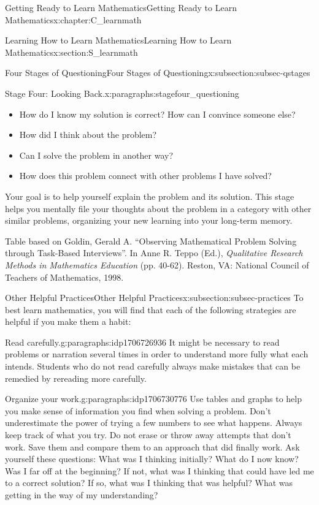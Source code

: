 \documentclass[oneside,10pt,]{book}
\newcommand{\pubtitle}[1]{\textsl{#1}}
\numberwithin{equation}{chapter}
\begin{document}
\begin{chapterptx}{Getting Ready to Learn Mathematics}{}{Getting Ready to Learn Mathematics}{}{}{x:chapter:C_learnmath}
\begin{sectionptx}{Learning How to Learn Mathematics}{}{Learning How to Learn Mathematics}{}{}{x:section:S_learnmath}
\begin{subsectionptx}{Four Stages of Questioning}{}{Four Stages of Questioning}{}{}{x:subsection:subsec-qstages}
\begin{paragraphs}{Stage Four: Looking Back.}{x:paragraphs:stagefour_questioning}
\par
%
\begin{itemize}[label=\textbullet]
\item{}How do I know my solution is correct? How can I convince someone else?%
\item{}How did I think about the problem?%
\item{}Can I solve the problem in another way?%
\item{}How does this problem connect with other problems I have solved?%
\end{itemize}
%
\par
Your goal is to help yourself explain the problem and its solution. This stage helps you mentally file your thoughts about the problem in a category with other similar problems, organizing your new learning into your long-term memory.%
\par
Table based on Goldin, Gerald A. ``Observing Mathematical Problem Solving through Task-Based Interviews''. In Anne R. Teppo (Ed.), \pubtitle{Qualitative Research Methods in Mathematics Education} (pp. 40-62). Reston, VA: National Council of Teachers of Mathematics, 1998.%
\end{paragraphs}%
\end{subsectionptx}
%
%
\typeout{************************************************}
\typeout{************************************************}
%
\begin{subsectionptx}{Other Helpful Practices}{}{Other Helpful Practices}{}{}{x:subsection:subsec-practices}
To best learn mathematics, you will find that each of the following strategies are helpful if you make them a habit:%
\begin{paragraphs}{Read carefully.}{g:paragraphs:idp1706726936}%
It might be necessary to read problems or narration several times in order to understand more fully what each intends. Students who do not read carefully always make mistakes that can be remedied by rereading more carefully.%
\end{paragraphs}%
\begin{paragraphs}{Organize your work.}{g:paragraphs:idp1706730776}%
Use tables and graphs to help you make sense of information you find when solving a problem. Don't underestimate the power of trying a few numbers to see what happens. Always keep track of what you try. Do not erase or throw away attempts that don't work. Save them and compare them to an approach that did finally work. Ask yourself these questions: What was I thinking initially? What do I now know? Was I far off at the beginning? If not, what was I thinking that could have led me to a correct solution? If so, what was I thinking that was helpful? What was getting in the way of my understanding?%

\end{paragraphs}
\end{subsectionptx}
\end{sectionptx}
\end{chapterptx}
\end{document}
